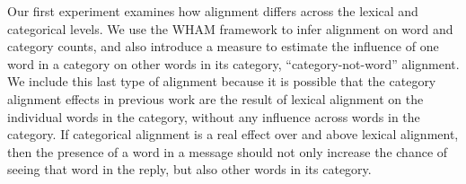 \documentclass[11pt]{article}
\begin{document}
Our first experiment examines how alignment differs across the lexical and categorical levels. We use the WHAM framework to infer alignment on word and category counts, and also introduce a measure to estimate the influence of one word in a category on other words in its category, ``category-not-word'' alignment. We include this last type of alignment because it is possible that the category alignment effects in previous work are the result of lexical alignment on the individual words in the category, without any influence across words in the category. If categorical alignment is a real effect over and above lexical alignment, then the presence of a word in a message should not only increase the chance of seeing that word in the reply, but also other words in its category.





\end{document}
